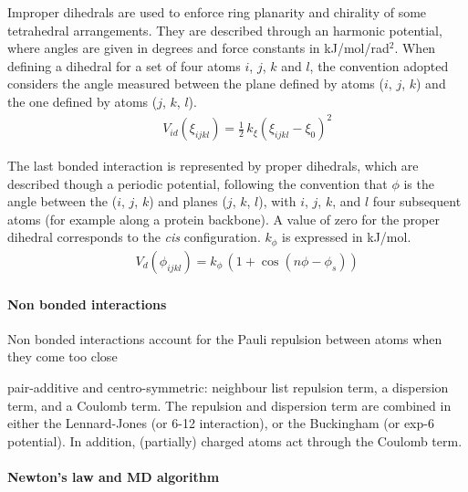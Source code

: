 Improper dihedrals are used to enforce ring planarity and chirality of some tetrahedral arrangements. They are described through an harmonic potential, where angles are given in degrees and force constants in kJ/mol/rad$^2$. When defining a dihedral for a set of four atoms $i$, $j$, $k$ and $l$, the convention adopted considers the angle measured between the plane defined by atoms ($i$, $j$, $k$) and the one defined by atoms ($j$, $k$, $l$).
\begin{eqnarray}
&& V_{id} (\xi_{ijkl}) = \frac{1}{2}\,k_\xi \left( \xi_{ijkl} - \xi_0 \right)^2
\end{eqnarray}

The last bonded interaction is represented by proper dihedrals, which are described though a periodic potential, following the convention that $\phi$ is the angle between the ($i$, $j$, $k$) and  planes ($j$, $k$, $l$), with $i$, $j$, $k$, and $l$ four subsequent atoms (for example along a protein backbone). A value of zero for the proper dihedral corresponds to the \textit{cis} configuration. $k_\phi$ is expressed in kJ/mol.
\begin{eqnarray}
&& V_d(\phi_{ijkl}) = k_\phi\,\left( 1 + \cos\left( n\phi - \phi_s \right) \right)
\end{eqnarray}

\paragraph{Non bonded interactions}
Non bonded interactions account for the Pauli repulsion between atoms when they come too close


pair-additive and centro-symmetric:
neighbour list
repulsion term, a dispersion term, and a Coulomb term.
The repulsion and dispersion term are combined in either the Lennard-Jones (or 6-12 interaction),
or the Buckingham (or exp-6 potential). In addition, (partially) charged atoms act through the
Coulomb term.

\paragraph{Newton's law and MD algorithm}
